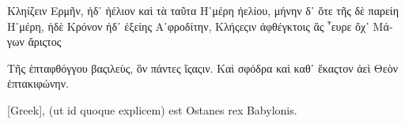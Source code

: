 \begin{parnumbers}
%
%
%
	\textgreek{Κληίζειν Ερμῆν, ἠδ᾿ ἠέλιον καὶ τὰ ταῦτα}
	\textgreek{Η῾μέρη ἠελίου, μήνην δ᾿ ὅτε τῆς δὲ παρείη}
	\textgreek{Η῾μέρη, ἠδὲ Κρόνον ἠδ᾿ ἑξείης Α᾿φροδίτην},
%
	\textgreek{Κλήςεςιν ἀφθέγκτοις ἃς ῟ευρε ὄχ᾿ Μάγων ἄριςτος}

{}

	\textgreek{Τῆς ἑπταφθόγγου βαςιλεὺς, ὃν πάντες ἴςαςιν.}
%
	\textgreek{Καὶ σφόδρα καὶ καθ᾿ ἕκαςτον ἀεὶ Θεὸν ἑπτακιφώνην.}

\textgreek{[Greek]}, (ut id quoque explicem) est Ostanes rex Babylonis.


\end{parnumbers}
